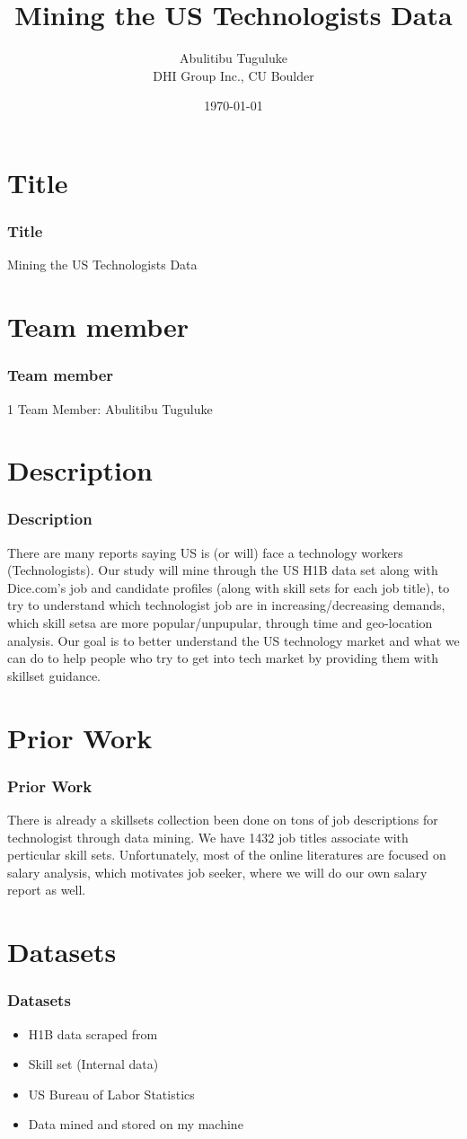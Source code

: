 \documentclass[10pt,mathserif]{beamer}
\title{\large \bfseries Mining the US Technologists Data}
\author{Abulitibu Tuguluke\\[3ex]
	DHI Group Inc., CU Boulder}
\date{\today}
\begin{document}
	
	\frame{
		\thispagestyle{empty}
		\titlepage
	}
	
	\section{Title}
	\begin{frame}
		\frametitle{Title}
		Mining the US Technologists Data
		\end{frame}
	
	\section{Team member}
\begin{frame}
	\frametitle{Team member}
	1 Team Member: Abulitibu Tuguluke
\end{frame}

	\section{Description}
\begin{frame}
	\frametitle{Description}
	There are many reports saying US is (or will) face a technology workers (Technologists). Our study will mine through the US H1B data set along with Dice.com's job and candidate profiles (along with skill sets for each job title), to try to understand which technologist job are in increasing/decreasing demands, which skill setsa are more popular/unpupular, through time and geo-location analysis. Our goal is to better understand the US technology market and what we can do to help people who try to get into tech market by providing them with skillset guidance. 
\end{frame}
	
		\section{Prior Work}
	\begin{frame}
		\frametitle{Prior Work}
		There is already a skillsets collection been done on tons of job descriptions for technologist through data mining. We have 1432 job titles associate with perticular skill sets. Unfortunately, most of the online literatures are focused on salary analysis, which motivates job seeker, where we will do our own salary report as well.
	\end{frame}
	\section{Datasets}
\begin{frame}
	\frametitle{Datasets}
	\begin{itemize}
		\item H1B data  scraped from 
		
		\item Skill set (Internal data)
		\item US Bureau of Labor Statistics 
	    \item Data mined and stored on my machine
	\end{itemize}
\end{frame}
\end{document}

